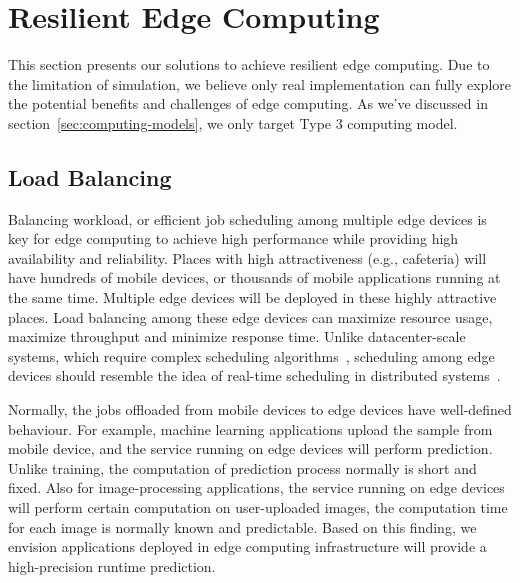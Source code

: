 \section{Resilient Edge Computing}
\label{sec:application}

This section presents our solutions to achieve resilient edge computing.
Due to the limitation of simulation, we believe only real implementation can
fully explore the potential benefits and challenges of edge computing.
As we've discussed in section~\ref{sec:computing-models}, we only target Type 3 computing model.

\subsection{Load Balancing}
Balancing workload, or efficient job scheduling among multiple edge devices is key for edge computing
to achieve high performance while providing high availability and reliability.
Places with high attractiveness (e.g., cafeteria) will have hundreds of mobile devices,
or thousands of mobile applications running at the same time. Multiple edge devices
will be deployed in these highly attractive places. Load balancing among these
edge devices can maximize resource usage, maximize throughput and minimize response time.
Unlike datacenter-scale systems, which require complex scheduling algorithms~\cite{DRF-NSDI11,Borg-Eurosys15},
scheduling among edge devices should resemble the idea of real-time scheduling in distributed systems~\cite{rt-sched98}.

Normally, the jobs offloaded from mobile devices to edge devices have well-defined behaviour.
For example, machine learning applications upload the sample from mobile device, and the
service running on edge devices will perform prediction. Unlike training, the computation
of prediction process normally is short and fixed. Also for image-processing applications, the
service running on edge devices will perform certain computation on user-uploaded images, the
computation time for each image is normally known and predictable. Based on this finding,
we envision applications deployed in edge computing infrastructure will provide a high-precision runtime prediction.

